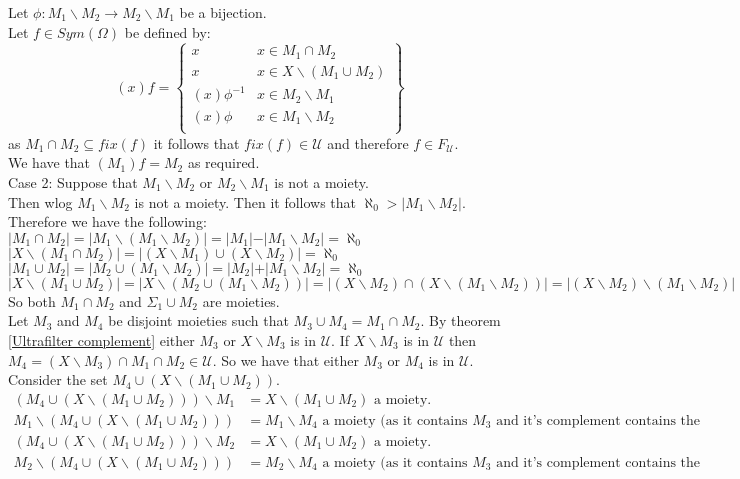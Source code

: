 \documentclass{report}
\begin{document}
Let $\phi: M_1 \backslash  M_2 \rightarrow M_2 \backslash  M_1$ be a bijection.\\
Let $f\in Sym(\Omega)$ be defined by:
$$(x)f = \left\{
    \begin{array}{lr}
      x &  x \in M_1 \cap M_2\\
      x &  x \in X \backslash (M_1 \cup M_2)\\
      (x)\phi^{-1} &  x \in M_2 \backslash  M_1\\
      (x)\phi &  x \in M_1 \backslash  M_2\\
    \end{array}
    \right\}$$
as $M_1 \cap M_2 \subseteq fix(f)$ it follows that $fix(f) \in \mathcal{U}$ and therefore $f \in F_{\mathcal{U}}$.\\
We have that $(M_1)f = M_2$ as required.\\
Case 2: Suppose that $M_1 \backslash  M_2$ or $M_2 \backslash  M_1$ is not a moiety.\\
Then wlog $M_1 \backslash  M_2$ is not a moiety. Then it follows that $\aleph_0 > \vert M_1 \backslash  M_2 \vert$.\\ 
Therefore we have the following:\\
 $\vert M_1 \cap M_2 \vert = \vert M_1 \backslash (M_1 \backslash  M_2)\vert = \vert M_1 \vert - \vert M_1 \backslash  M_2 \vert = \aleph_0$\\
  $\vert X \backslash  (M_1 \cap M_2) \vert =  \vert (X \backslash  M_1) \cup (X \backslash  M_2) \vert  = \aleph_0$\\
 $\vert M_1 \cup M_2 \vert = \vert M_2 \cup (M_1 \backslash  M_2)\vert = \vert M_2 \vert + \vert M_1 \backslash  M_2 \vert = \aleph_0$\\
  $\vert X \backslash  (M_1 \cup M_2) \vert =  \vert X \backslash  (M_2 \cup (M_1 \backslash M_2)) \vert =  \vert (X \backslash  M_2) \cap (X \backslash (M_1 \backslash  M_2)) \vert=  \vert (X \backslash  M_2)  \backslash (M_1 \backslash M_2) \vert= \aleph_0$
So both $M_1 \cap M_2$ and $\Sigma_1 \cup M_2$ are moieties. \\
Let $M_3$ and $M_4$ be disjoint moieties such that $M_3 \cup M_4 = M_1 \cap M_2$. By theorem \ref{Ultrafilter complement} either $M_3$ or $X \backslash  M_3$ is in $\mathcal{U}$. If $X \backslash  M_3$ is in $\mathcal{U}$ then $M_4 = (X \backslash  M_3)\cap M_1 \cap M_2 \in \mathcal{U}$. So we have that either $M_3$ or $M_4$ is in $\mathcal{U}$.\\
Consider the set $M_4 \cup (X \backslash (M_1 \cup M_2))$.
\begin{align*}
(M_4 \cup (X \backslash (M_1 \cup M_2))) \backslash M_1&= X \backslash (M_1 \cup M_2) \text{ a moiety}.\\
M_1 \backslash(M_4 \cup (X \backslash (M_1 \cup M_2)))&= M_1 \backslash M_4\text{ a moiety (as it contains }M_3\text{ and it's complement contains the complement of }M_1\text{).}\\
(M_4 \cup (X \backslash (M_1 \cup M_2)))\backslash M_2&= X \backslash (M_1 \cup M_2) \text{ a moiety.}\\
M_2 \backslash(M_4 \cup (X \backslash (M_1 \cup M_2)))&= M_2 \backslash M_4\text{ a moiety (as it contains }M_3\text{ and it's complement contains the complement of }M_2\text{).}
\end{align*}
\end{document}
